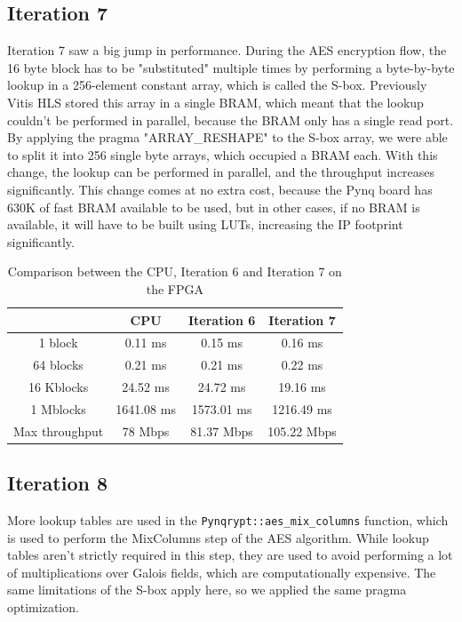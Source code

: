 \documentclass[12pt,oneside,a4paper]{article}
\begin{document}
\subsection{Iteration 7} \label{subsec:iter7}
Iteration 7 saw a big jump in performance. 
During the AES encryption flow, the 16 byte block has to be "substituted" multiple times by performing a byte-by-byte lookup in a 256-element constant array, which is called the S-box.
Previously Vitis HLS stored this array in a single BRAM, which meant that the lookup couldn't be performed in parallel, because the BRAM only has a single read port.
By applying the pragma "ARRAY\_RESHAPE" to the S-box array, we were able to split it into 256 single byte arrays, which occupied a BRAM each. With this change, the lookup can be performed in parallel, and the throughput increases significantly.
This change comes at no extra cost, because the Pynq board has 630K of fast BRAM available to be used, but in other cases, if no BRAM is available, it will have to be built using LUTs, increasing the IP footprint significantly.

\begin{table}[h!]
	\centering
	\begin{tabular}{cccc}
		\toprule
		 & CPU & Iteration 6 & Iteration 7 \\
		\midrule
		1 block & 0.11 ms & 0.15 ms & 0.16 ms \\
		64 blocks & 0.21 ms & 0.21 ms & 0.22 ms \\
		16 Kblocks & 24.52 ms & 24.72 ms & 19.16 ms \\
		1 Mblocks & 1641.08 ms & 1573.01 ms & 1216.49 ms \\
		Max throughput & 78 Mbps & 81.37 Mbps & 105.22 Mbps \\
		\bottomrule
	\end{tabular}
	\caption{Comparison between the CPU, Iteration 6 and Iteration 7 on the FPGA}
\end{table}

\subsection{Iteration 8} \label{subsec:iter8}
More lookup tables are used in the {\tt Pynqrypt::aes\_mix\_columns} function, which is used to perform the MixColumns step of the AES algorithm.
While lookup tables aren't strictly required in this step, they are used to avoid performing a lot of multiplications over Galois fields, which are computationally expensive.
The same limitations of the S-box apply here, so we applied the same pragma optimization.
\end{document}

